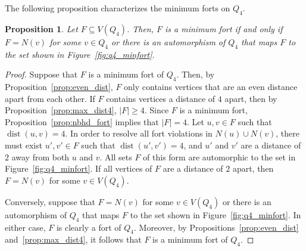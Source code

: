 \documentclass[twoside, 12pt]{article}
\newtheorem{proposition}[theorem]{Proposition}
\theoremstyle{definition}
\newcommand\abs[1]{\left|#1\right|}
\newcommand\dist[2]{\operatorname{dist}\left(#1,#2\right)}
\begin{document}
The following proposition characterizes the minimum forts on $Q_{4}$.
\begin{proposition}\label{prop:min_fort4}
Let $F\subseteq V(Q_{4})$. 
Then, $F$ is a minimum fort if and only if $F=N(v)$ for some $v\in Q_{4}$ or there is an automorphism of $Q_{4}$ that maps $F$ to the set shown in Figure~\ref{fig:q4_minfort}.
\end{proposition}
\begin{proof}
Suppose that $F$ is a minimum fort of $Q_{4}$.
Then, by Proposition~\ref{prop:even_dist}, $F$ only contains vertices that are an even distance apart from each other. 
If $F$ contains vertices a distance of $4$ apart, then by Proposition~\ref{prop:max_dist4}, $\abs{F}\geq 4$.
Since $F$ is a minimum fort, Proposition~\ref{prop:nbhd_fort} implies that $\abs{F}=4$.
Let $u,v\in F$ such that $\dist{u}{v}=4$.
In order to resolve all fort violations in $N(u)\cup N(v)$, there must exist $u',v'\in F$ such that $\dist{u'}{v'}=4$, and $u'$ and $v'$ are a distance of $2$ away from both $u$ and $v$. 
All sets $F$ of this form are automorphic to the set in Figure~\ref{fig:q4_minfort}.
If all vertices of $F$ are a distance of $2$ apart, then $F=N(v)$ for some $v\in V(Q_{4})$.

Conversely, suppose that $F=N(v)$ for some $v\in V(Q_{4})$ or there is an automorphism of $Q_{4}$ that maps $F$ to the set shown in Figure~\ref{fig:q4_minfort}.
In either case, $F$ is clearly a fort of $Q_{4}$.
Moreover, by Propositions~\ref{prop:even_dist} and~\ref{prop:max_dist4}, it follows that $F$ is a minimum fort of $Q_{4}$.
\end{proof}
\end{document}
